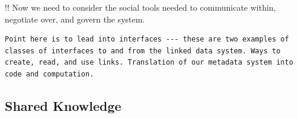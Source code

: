 \documentclass[10pt]{article}
\begin{document}
\begin{multicols}{2}
!! Now we need to consider the social tools needed to communicate
within, negotiate over, and govern the system.

\begin{verbatim}
Point here is to lead into interfaces --- these are two examples of classes of interfaces to and from the linked data system. Ways to create, read, and use links. Translation of our metadata system into code and computation. 
\end{verbatim}


\end{multicols}


\hypertarget{shared-knowledge}{%
\subsection{Shared Knowledge}\label{shared-knowledge}}
\end{document}
